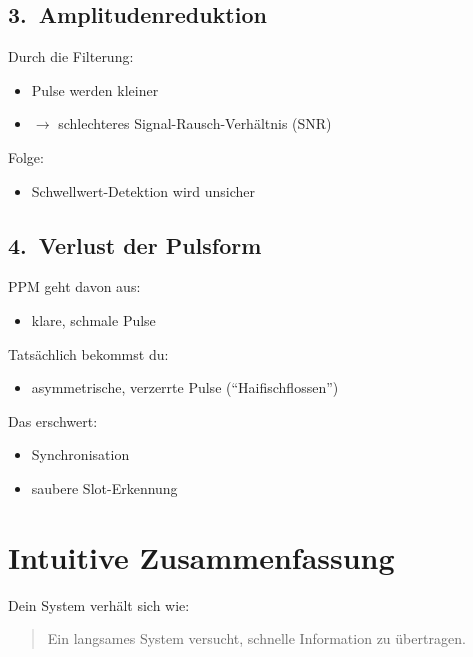 \documentclass[a4paper,12pt]{article}
\begin{document}
\subsection*{3.\ Amplitudenreduktion}

Durch die Filterung:

\begin{itemize}
  \item Pulse werden kleiner
  \item $\rightarrow$ schlechteres Signal-Rausch-Verhältnis (SNR)
\end{itemize}

Folge:

\begin{itemize}
  \item Schwellwert-Detektion wird unsicher
\end{itemize}

\subsection*{4.\ Verlust der Pulsform}

PPM geht davon aus:

\begin{itemize}
  \item klare, schmale Pulse
\end{itemize}

Tatsächlich bekommst du:

\begin{itemize}
  \item asymmetrische, verzerrte Pulse (\enquote{Haifischflossen})
\end{itemize}

Das erschwert:

\begin{itemize}
  \item Synchronisation
  \item saubere Slot-Erkennung
\end{itemize}

\section*{Intuitive Zusammenfassung}

Dein System verhält sich wie:

\begin{quote}
  Ein langsames System versucht, schnelle Information zu übertragen.
\end{quote}
\end{document}
